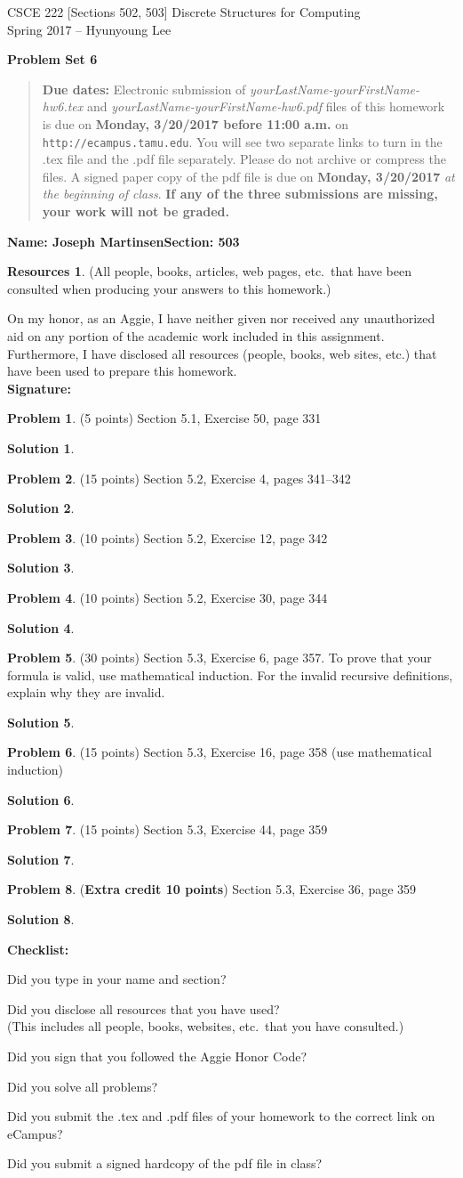 \documentclass{article}
\theoremstyle{definition}
\newtheorem{problem}{Problem}
\newtheorem*{solution}{Solution}
\newtheorem*{resources}{Resources}
\newcommand{\name}[2]{\noindent\textbf{Name: #1}\hfill \textbf{Section: #2}}
\newcommand{\honor}{\noindent On my honor, as an Aggie, I have neither
  given nor received any unauthorized aid on any portion of the
  academic work included in this assignment. Furthermore, I have
  disclosed all resources (people, books, web sites, etc.) that have
  been used to prepare this homework. \\[2ex]
 \textbf{Signature:} \underline{\hspace*{10cm}} }
\newcommand{\checklist}{\noindent\textbf{Checklist:}
\begin{compactitem}[$\Box$] 
\item Did you type in your name and section? 
\item Did you disclose all resources that you have used? \\
(This includes all people, books, websites, etc.\ that you have consulted.)
\item Did you sign that you followed the Aggie Honor Code? 
\item Did you solve all problems? 
\item Did you submit the .tex and .pdf files of your homework to the correct link on eCampus?
\item Did you submit a signed hardcopy of the pdf file in class? 
\end{compactitem}
}
\newcommand{\problemset}[1]{\begin{center}\textbf{Problem Set #1}\end{center}}
\newcommand{\duedate}[2]{\begin{quote}\textbf{Due dates:} Electronic
    submission of \textsl{yourLastName-yourFirstName-hw6.tex} and 
    \textsl{yourLastName-yourFirstName-hw6.pdf} files of this homework is due on
    \textbf{#1} on \texttt{http://ecampus.tamu.edu}. You will see two separate links
    to turn in the .tex file and the .pdf file separately. Please do not archive or compress the files.  
    A signed paper copy of the pdf file is due on \textbf{#2} \textsl{at the beginning of class}.
    \textbf{If any of the three submissions are missing, your work will not be graded.}\end{quote} }
\begin{document}
\vspace*{-15mm}
\begin{center}
{\large
CSCE 222 [Sections 502, 503] Discrete Structures for Computing\\[.5ex]
Spring 2017 -- Hyunyoung Lee\\}
\end{center}
\problemset{6}
\duedate{Monday, 3/20/2017 before 11:00 a.m.}{Monday, 3/20/2017}
\name{Joseph Martinsen}{503}
\begin{resources} (All people, books, articles, web pages, etc.\ that
  have been consulted when producing your answers to this homework.)
\end{resources}
\honor

\smallskip

\begin{problem} (5 points) 
Section 5.1, Exercise 50, page 331
\end{problem}
\begin{solution} 
\end{solution}

\begin{problem} (15 points) 
Section 5.2, Exercise 4, pages 341--342
\end{problem}
\begin{solution} 
\end{solution}

\begin{problem} (10 points)
Section 5.2, Exercise 12, page 342
\end{problem}
\begin{solution} 
\end{solution}

\begin{problem} (10 points)
Section 5.2, Exercise 30, page 344
\end{problem}
\begin{solution} 
\end{solution}

\begin{problem} (30 points)
Section 5.3, Exercise 6, page 357.
To prove that your formula is valid, use mathematical induction.
For the invalid recursive definitions, explain why they are invalid.
\end{problem}
\begin{solution} 
\end{solution}

\begin{problem} (15 points)
Section 5.3, Exercise 16, page 358 (use mathematical induction)
\end{problem}
\begin{solution} 
\end{solution}

\begin{problem} (15 points)
Section 5.3, Exercise 44, page 359
\end{problem}
\begin{solution} 
\end{solution}

\begin{problem} (\textbf{Extra credit 10 points})
Section 5.3, Exercise 36, page 359
\end{problem}
\begin{solution} 
\end{solution}

\goodbreak
\checklist
\end{document}

